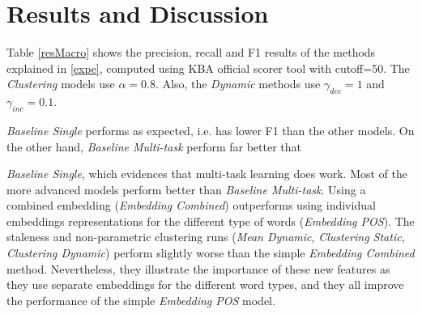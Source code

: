 \documentclass{sig-alternate}
\newcommand{\todo}[1]{\noindent{\textcolor{red}{\{{\bf TODO:}  #1\}}}}
\begin{document}
\section{Results and Discussion}


Table \ref{resMacro} shows the precision, recall and F1 results of the methods explained in \ref{expe}, computed using KBA official scorer tool with cutoff=50. The \textit{Clustering} models use $\alpha=0.8$. Also, the \textit{Dynamic} methods use $\gamma_{dec}=1$ and $\gamma_{inc}=0.1$.
{\textit{Baseline Single} performs as expected, i.e. has lower F1 than the other models.
On the other hand, {\textit{Baseline Multi-task}} perform far better that {\textit{Baseline Single}, which evidences that multi-task learning does work.
Most of the more advanced models perform better than {\textit{Baseline Multi-task}}. Using a combined embedding ({\textit{Embedding Combined}}) outperforms using individual embeddings representations for the different type of words ({\textit{Embedding POS}}).
The staleness and non-parametric clustering runs ({\textit{Mean Dynamic}}, {\textit{Clustering Static}}, {\textit{Clustering Dynamic}}) perform slightly worse than the simple {\textit{Embedding Combined}} method.
Nevertheless, they illustrate the importance of these new features as they use separate embeddings for the different word types, and they all improve the performance of the simple {\textit{Embedding POS}} model.


}}
\end{document}
